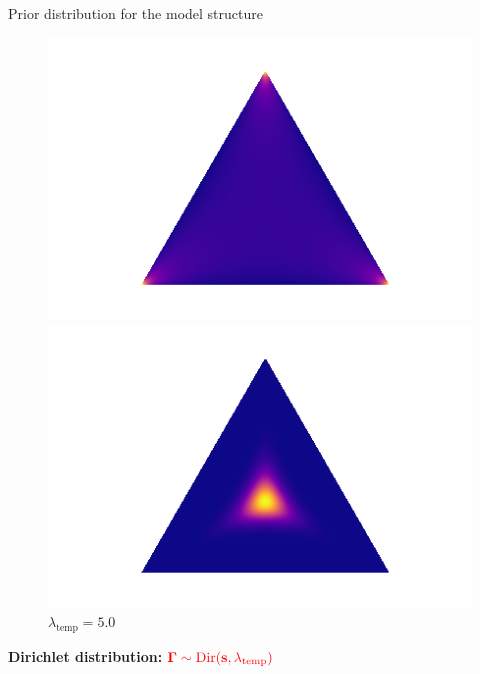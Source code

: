 \documentclass[usenames,dvipsnames,11pt,pdf,utf8,russian,aspectratio=43]{beamer}
\begin{document}
\begin{frame}{Prior distribution for the model structure}
\begin{figure}
\begin{minipage}[t]{.3\textwidth}
\begin{tikzpicture}[%
x={(1.7cm,0cm)},
y={(0cm,1.7cm)},
]
\end{tikzpicture}
\caption*{$\lambda_\text{temp}\to0$}
\end{minipage}
\hfill
 \begin{minipage}[t]{.3\textwidth}
   \includegraphics[width=\textwidth]{gs0995.png}
\caption*{$\lambda_\text{temp}=0.995$}
\end{minipage}
\hfill
 \begin{minipage}[t]{.3\textwidth}
   \includegraphics[width=\textwidth]{gs5.png}
\caption*{$\lambda_\text{temp}=5.0$}
\end{minipage}

\end{figure}

\textbf{Dirichlet distribution: }$\textcolor{red}{\boldsymbol{\Gamma}\sim \text{Dir}(\mathbf{s}, \lambda_\text{temp})}$\\
\begin{figure}
 \begin{minipage}[t]{.3\textwidth}
        \centering
\begin{tikzpicture}[%
x={(1.7cm,0cm)},
y={(0cm,1.7cm)},
]


\end{tikzpicture}
\end{minipage}
\end{figure}
\end{frame}
\end{document}
